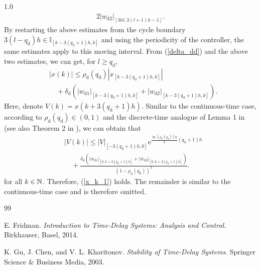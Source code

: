 \documentclass[journal]{IEEEtran}
\begin{document}
\begin{spacing}{1.0}
\begin{align*}
{2}\left\vert w_{\mathrm{d}2}\right\vert _{[3hl,3(l+1)h-1]}.
\end{align*}
By restarting the above estimates from the cycle boundary $3(l-q_{\mathrm{d}})h\in\mathbb{I}_{[k-3(q_{\mathrm{d}}+1)h,k]}$ and using the periodicity of the controller, the same estimates apply to this moving interval. From (\ref{delta_dd}) and the above two estimates, we can get, for $l\geq q_{\mathrm{d}}$,
\begin{align}
&\left\vert x(k)\right\vert
\leq\rho_{\mathrm{d}}(q_{\mathrm{d}})
\left\vert x_{[k-3(q_{\mathrm{d}}+1)h,k]}\right\vert
\nonumber\\
&\quad+\delta_{\mathrm{d}}\left({
\left\vert w_{\mathrm{d}1}\right\vert _{[k-3(q_{\mathrm{d}}+1)h,k]}
+\left\vert w_{\mathrm{d}2}\right\vert _{[k-3(q_{\mathrm{d}}+1)h,k]}}\right).
\end{align}
Here, denote
$V(k)=x(k+3(q_{\mathrm{d}}+1)h)$. Similar to the continuous-time case, according to
$\rho_{\mathrm{d}}(q_{\mathrm{d}})\in(0,1)$ and the discrete-time analogue of Lemma 1
in \cite{Mazen14tac} (see also Theorem 2 in \cite{Mazenc24css}), we can obtain that
\begin{align}
&\left\vert V(k)\right\vert
\leq\left\vert V\right\vert_[-3(q_{\mathrm{d}}+1)h,0]
\mathrm{e}^{\frac{\ln\left(
\rho_{\mathrm{d}}(q_{\mathrm{d}})\right)k}
3(q_{\mathrm{d}}+1)h}
\nonumber\\
&\quad+\frac{\delta_{\mathrm{d}}\left(
\left\vert w_{\mathrm{d}1}\right\vert _{[0,k+3(q_{\mathrm{d}}+1)h]}
+\left\vert w_{\mathrm{d}2}\right\vert _{[0,k+3(q_{\mathrm{d}}+1)h]}\right)}
{\left(1-\rho_{\mathrm{d}}(q_{\mathrm{d}})\right)^{2}}.
\end{align}
for all $k\in\mathbf{%
\mathbb{N}
}$. Therefore, (\ref{x_k_1}) holds. The remainder is similar to the continuous-time case and is therefore omitted.






%
%
%

\begin{thebibliography}{99}

E. Fridman. \textit{Introduction to Time-Delay Systems:
Analysis and Control}. Birkhauser, Basel, 2014.

K. Gu, J. Chen, and V. L. Kharitonov. \textit{Stability of
Time-Delay Systems}. Springer Science \& Business Media, 2003.


\end{thebibliography}
\end{spacing}
\end{document}
